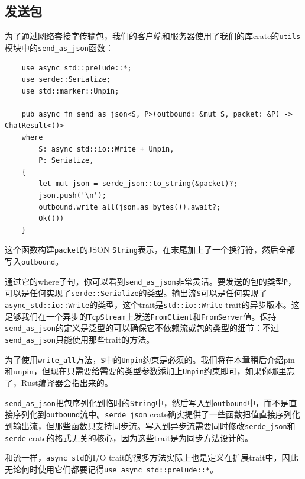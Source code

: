 \subsection{发送包}
为了通过网络套接字传输包，我们的客户端和服务器使用了我们的库crate的\texttt{utils}模块中的\texttt{send\_as\_json}函数：
\begin{verbatim}
    use async_std::prelude::*;
    use serde::Serialize;
    use std::marker::Unpin;

    pub async fn send_as_json<S, P>(outbound: &mut S, packet: &P) -> ChatResult<()>
    where
        S: async_std::io::Write + Unpin,
        P: Serialize,
    {
        let mut json = serde_json::to_string(&packet)?;
        json.push('\n');
        outbound.write_all(json.as_bytes()).await?;
        Ok(())
    }
\end{verbatim}

这个函数构建\texttt{packet}的JSON \texttt{String}表示，在末尾加上了一个换行符，然后全部写入\texttt{outbound}。

通过它的where子句，你可以看到\texttt{send\_as\_json}非常灵活。要发送的包的类型\texttt{P}，可以是任何实现了\texttt{serde::Serialize}的类型。输出流\texttt{S}可以是任何实现了\texttt{async_std::io::Write}的类型，这个trait是\texttt{std::io::Write} trait的异步版本。这足够我们在一个异步的\texttt{TcpStream}上发送\texttt{FromClient}和\texttt{FromServer}值。保持\texttt{send\_as\_json}的定义是泛型的可以确保它不依赖流或包的类型的细节：不过\texttt{send\_as\_json}只能使用那些trait的方法。

为了使用\texttt{write\_all}方法，\texttt{S}中的\texttt{Unpin}约束是必须的。我们将在本章稍后介绍pin和unpin，但现在只需要给需要的类型参数添加上\texttt{Unpin}约束即可，如果你哪里忘了，Rust编译器会指出来的。

\texttt{send\_as\_json}把包序列化到临时的\texttt{String}中，然后写入到\texttt{outbound}中，而不是直接序列化到\texttt{outbound}流中。\texttt{serde\_json} crate确实提供了一些函数把值直接序列化到输出流，但那些函数只支持同步流。写入到异步流需要同时修改\texttt{serde\_json}和\texttt{serde} crate的格式无关的核心，因为这些trait是为同步方法设计的。

和流一样，\texttt{async\_std}的I/O trait的很多方法实际上也是定义在扩展trait中，因此无论何时使用它们都要记得\texttt{use async\_std::prelude::*}。

